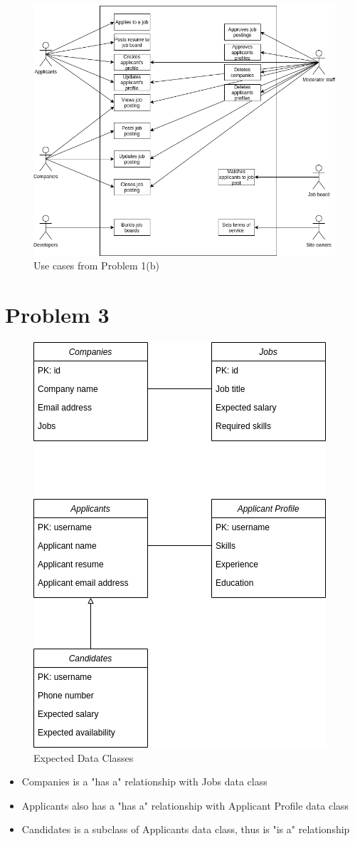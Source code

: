 \documentclass{article}
\begin{document}
\begin{figure}[h]
	\centering
	\includegraphics[scale=0.65]{Assignment_4.2_UseCaseDiagram.png}
	\caption{Use cases from Problem 1(b)}
	\label{Use Cases}
\end{figure}

\newpage

\section*{Problem 3} 

\begin{figure}[h]
	\centering
	\includegraphics[scale=0.65]{Assignment _4.3_DataClasses.png}
	\caption{Expected Data Classes}
	\label{Data Classes}
\end{figure}

\begin{itemize}
	\item Companies is a "has a" relationship with Jobs data class
	\item Applicants also has a "has a" relationship with Applicant Profile data class
	\item Candidates is a subclass of Applicants data class, thus is "is a" relationship
\end{itemize}
\end{document}
